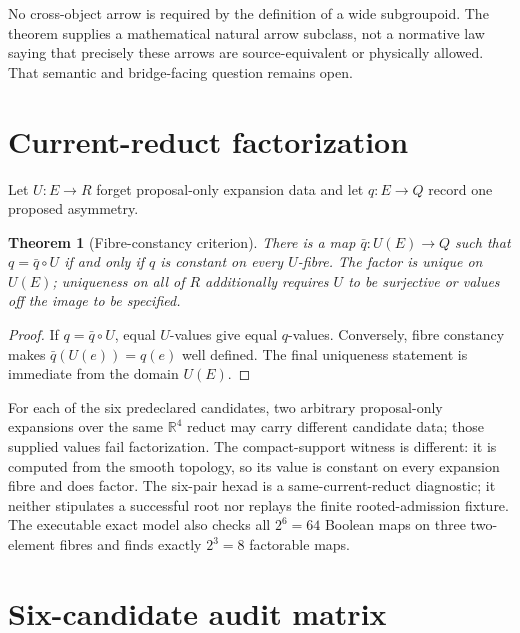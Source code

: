 \documentclass[11pt]{article}
\newtheorem{theorem}{Theorem}
\begin{document}
No cross-object arrow is required by the definition of a wide subgroupoid.
The theorem supplies a mathematical natural arrow subclass, not a normative
law saying that precisely these arrows are source-equivalent or physically
allowed.  That semantic and bridge-facing question remains open.

\section{Current-reduct factorization}

Let \(U:E\to R\) forget proposal-only expansion data and let \(q:E\to Q\)
record one proposed asymmetry.

\begin{theorem}[Fibre-constancy criterion]
There is a map \(\bar q:U(E)\to Q\) such that
\(q=\bar q\circ U\) if and only if \(q\) is constant on every \(U\)-fibre.
The factor is unique on \(U(E)\); uniqueness on all of \(R\) additionally
requires \(U\) to be surjective or values off the image to be specified.
\end{theorem}

\begin{proof}
If \(q=\bar q\circ U\), equal \(U\)-values give equal \(q\)-values.
Conversely, fibre constancy makes \(\bar q(U(e))=q(e)\) well defined.  The
final uniqueness statement is immediate from the domain \(U(E)\).
\end{proof}

For each of the six predeclared candidates, two arbitrary proposal-only
expansions over the same \(\mathbb{R}^{4}\) reduct may carry different
candidate data; those supplied values fail factorization.  The compact-support
witness is different: it is computed from the smooth topology, so its value is
constant on every expansion fibre and does factor.  The six-pair hexad is a
same-current-reduct diagnostic; it neither stipulates a successful root nor
replays the finite rooted-admission fixture.  The executable exact model also
checks all \(2^{6}=64\) Boolean maps on three two-element fibres and finds
exactly \(2^{3}=8\) factorable maps.

\section{Six-candidate audit matrix}
\end{document}
